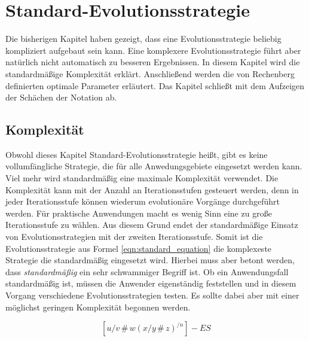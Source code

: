 
\section{Standard-Evolutionsstrategie}
Die bisherigen Kapitel haben gezeigt, dass eine Evolutionsstrategie beliebig kompliziert aufgebaut sein kann. Eine komplexere Evolutionsstrategie führt aber natürlich nicht automatisch zu besseren Ergebnissen.
In diesem Kapitel wird die standardmäßige Komplexität erklärt. Anschließend werden die von Rechenberg definierten optimale Parameter erläutert. Das Kapitel schließt mit dem Aufzeigen der Schächen der Notation ab.

\subsection{Komplexität}
Obwohl dieses Kapitel Standard-Evolutionsstrategie heißt, gibt es keine vollumfängliche Strategie, die für alle Anwedungsgebiete eingesetzt werden kann. Viel mehr wird standardmäßig eine maximale Komplexität verwendet.
Die Komplexität kann mit der Anzahl an Iterationsstufen gesteuert werden, denn in jeder Iterationsstufe können wiederum evolutionäre Vorgänge durchgeführt werden.
Für praktische Anwendungen macht es wenig Sinn eine zu große Iterationsstufe zu wählen. Aus diesem Grund endet der standardmäßige Einsatz von Evolutionsstrategien mit der zweiten Iterationsstufe.
Somit ist die Evolutionsstrategie aus Formel \ref{eqn:standard_equation} die komplexeste Strategie die standardmäßig eingesetzt wird. Hierbei muss aber betont werden, dass \textit{standardmäßig} ein sehr schwammiger Begriff ist. 
Ob ein Anwendungsfall standardmäßig ist, müssen die Anwender eigenständig feststellen und in diesem Vorgang verschiedene Evolutionsstrategien testen. Es sollte dabei aber mit einer möglichst geringen Komplexität begonnen werden.

\begin{equation}
\label{eqn:standard_equation}
[u/v\,\#\,w (x/y\,\#\,z)^{/n}]-ES
\end{equation}

